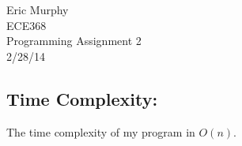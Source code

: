 \documentclass[12pt]{article}
\begin{document}
\begin{flushright}
  Eric Murphy \\
  ECE368 \\
  Programming Assignment 2 \\
  2/28/14
\end{flushright}

\subsection*{Time Complexity:}
The time complexity of my program in $ O(n) $.
\end{document}

